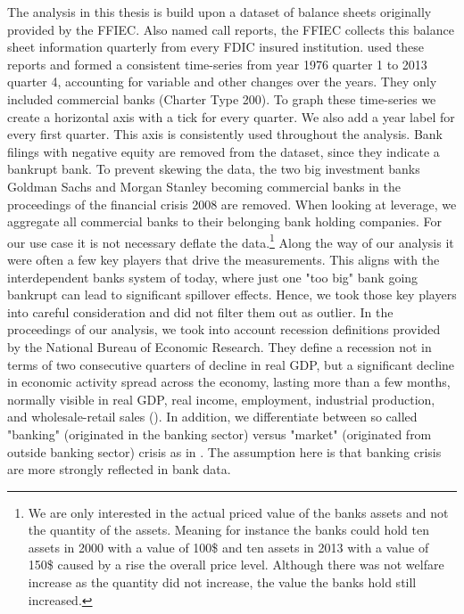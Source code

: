 \documentclass[12pt, a4paper]{article} %
\begin{document}
The analysis in this thesis is build upon a dataset of balance sheets originally provided by the FFIEC. Also named call reports, the FFIEC collects this balance sheet information quarterly from every FDIC insured institution. \citet{DrechslerSchnabel2017} used these reports and formed a consistent time-series from year 1976 quarter 1 to 2013 quarter 4, accounting for variable and other changes over the years. They only included commercial banks (Charter Type 200).
To graph these time-series we create a horizontal axis with a tick for every quarter. We also add a year label for every first quarter. This axis is consistently used throughout the analysis. Bank filings with negative equity are removed from the dataset, since they indicate a bankrupt bank. To prevent skewing the data, the two big investment banks Goldman Sachs and Morgan Stanley becoming commercial banks in the proceedings of the financial crisis 2008 are removed. When looking at leverage, we aggregate all commercial banks to their belonging bank holding companies. For our use case it is not necessary deflate the data.\footnote{We are only interested in the actual priced value of the banks assets and not the quantity of the assets. Meaning for instance the banks could hold ten assets in 2000 with a value of 100\$ and ten assets in 2013 with a value of 150\$ caused by a rise the overall price level. Although there was not welfare increase as the quantity did not increase, the value the banks hold still increased.} 
Along the way of our analysis it were often a few key players that drive the measurements. This aligns with the interdependent banks system of today, where just one "too big" bank going bankrupt can lead to significant spillover effects. Hence, we took those key players into careful consideration and did not filter them out as outlier. 
In the proceedings of our analysis, we took into account recession definitions provided by the National Bureau of Economic Research. They define a recession not in terms of two consecutive quarters of decline in real GDP, but a significant decline in economic activity spread across the economy, lasting more than a few months, normally visible in real GDP, real income, employment, industrial production, and wholesale-retail sales (\citet{NBERBusinessCycles}). In addition, we differentiate between so called "banking" (originated in the banking sector) versus "market" (originated from outside banking sector) crisis as in \citet{BergerBouwman2013}. The assumption here is that banking crisis are more strongly reflected in bank data.
\end{document}
